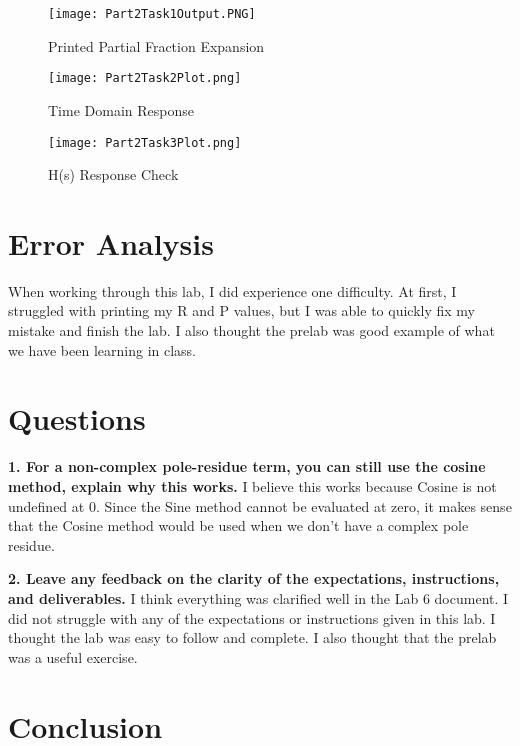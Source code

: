 \documentclass[12pt]{report}
\begin{document}
\begin{figure}
\texttt{[image: Part2Task1Output.PNG]}
\caption{Printed Partial Fraction Expansion}
\end{figure}

\begin{figure}
\texttt{[image: Part2Task2Plot.png]}
\caption{Time Domain Response}
\end{figure}

\begin{figure}
\texttt{[image: Part2Task3Plot.png]}
\caption{H(s) Response Check}
\end{figure}



\newpage

\section{Error Analysis}

When working through this lab, I did experience one difficulty. At first, I struggled with printing my R and P values, but I was able to quickly fix my mistake and finish the lab. I also thought the prelab was good example of what we have been learning in class. 



\section{Questions}

\textbf{1. For a non-complex pole-residue term, you can still use the cosine method, explain why this works.}
{I believe this works because Cosine is not undefined at 0. Since the Sine method cannot be evaluated at zero, it makes sense that the Cosine method would be used when we don't have a complex pole residue. }

\textbf{2. Leave any feedback on the clarity of the expectations, instructions, and deliverables.}
{I think everything was clarified well in the Lab 6 document. I did not struggle with any of the expectations or instructions given in this lab. I thought the lab was easy to follow and complete. I also thought that the prelab was a useful exercise.  }



\section{Conclusion}
\end{document}
